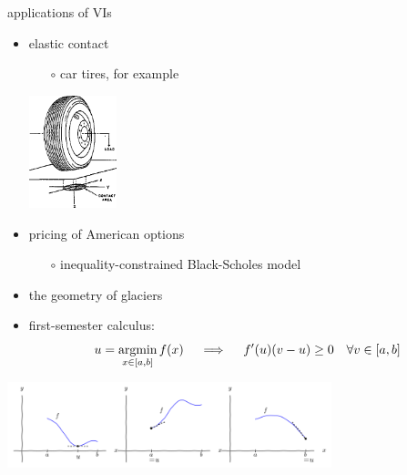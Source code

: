 \documentclass[svgnames,
               hyperref={colorlinks,citecolor=DeepPink4,linkcolor=FireBrick,urlcolor=Maroon},
               usepdftitle=false]  %
               {beamer}
\begin{document}
\begin{frame}{applications of VIs}

\begin{itemize}
\item elastic contact
    \begin{itemize}
    \item[$\circ$] car tires, for example
    \end{itemize}

\vspace{-10mm}
\hfill \includegraphics[width=0.2\textwidth]{../talk-dms/figs/tirecontact.png}

\vspace{-20mm}
\item pricing of American options
    \begin{itemize}
    \item[$\circ$] inequality-constrained Black-Scholes model
    \end{itemize}

\vspace{1.5mm}
\item the geometry of glaciers %

\vspace{1.5mm}
\item first-semester calculus:
    $$u = \mathop{\textnormal{argmin}}_{x\in[a,b]} f(x) \quad \implies \quad f'(u)(v-u) \ge 0 \quad \forall v \in[a,b]$$
\end{itemize}

\vspace{-5mm}
\begin{center}
\includegraphics[height=25mm]{../talk-oxford/images/calcone.png}
\end{center}
\end{frame}


\end{document}
